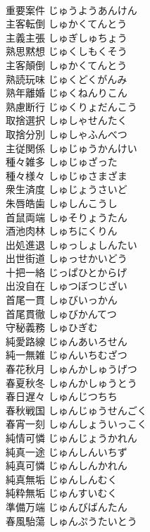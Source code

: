 \documentclass[8pt]{extreport}
\begin{document}
\begin{CJK}{UTF8}{min}
\\	重要案件	じゅうようあんけん	
\\	主客転倒	しゅかくてんとう	
\\	主義主張	しゅぎしゅちょう	
\\	熟思黙想	じゅくしもくそう	
\\	主客顛倒	しゅかくてんとう	
\\	熟読玩味	じゅくどくがんみ	
\\	熟年離婚	じゅくねんりこん	
\\	熟慮断行	じゅくりょだんこう	
\\	取捨選択	しゅしゃせんたく	
\\	取捨分別	しゅしゃふんべつ	
\\	主従関係	しゅじゅうかんけい	
\\	種々雑多	しゅじゅざった	
\\	種々様々	しゅじゅさまざま	
\\	衆生済度	しゅじょうさいど	
\\	朱唇皓歯	しゅしんこうし	
\\	首鼠両端	しゅそりょうたん	
\\	酒池肉林	しゅちにくりん	
\\	出処進退	しゅっしょしんたい	
\\	出世街道	しゅっせかいどう	
\\	十把一絡	じっぱひとからげ	
\\	出没自在	しゅつぼつじざい	
\\	首尾一貫	しゅびいっかん	
\\	首尾貫徹	しゅびかんてつ	
\\	守秘義務	しゅひぎむ	
\\	純愛路線	じゅんあいろせん	
\\	純一無雑	じゅんいちむざつ	
\\	春花秋月	しゅんかしゅうげつ	
\\	春夏秋冬	しゅんかしゅうとう	
\\	春日遅々	しゅんじつちち	
\\	春秋戦国	しゅんじゅうせんごく	
\\	春宵一刻	しゅんしょういっこく	
\\	純情可憐	じゅんじょうかれん	
\\	純真一途	じゅんしんいちず	
\\	純真可憐	じゅんしんかれん	
\\	純真無垢	じゅんしんむく	
\\	純粋無垢	じゅんすいむく	
\\	準備万端	じゅんびばんたん	
\\	春風駘蕩	しゅんぷうたいとう	

\end{CJK}
\end{document}
